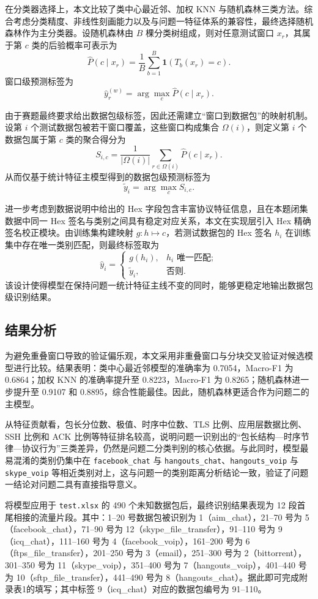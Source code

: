 \documentclass[UTF8,a4paper,12pt]{ctexart}
\begin{document}
在分类器选择上，本文比较了类中心最近邻、加权 KNN 与随机森林三类方法。综合考虑分类精度、非线性刻画能力以及与问题一特征体系的兼容性，最终选择随机森林作为主分类器。设随机森林由 $B$ 棵分类树组成，则对任意测试窗口 $x_r$，其属于第 $c$ 类的后验概率可表示为
\[
\hat P(c\mid x_r)=\frac1B\sum_{b=1}^B\mathbf 1(T_b(x_r)=c).
\]
窗口级预测标签为
\[
\hat y_r^{(w)}=\arg\max_c \hat P(c\mid x_r).
\]

由于赛题最终要求给出数据包级标签，因此还需建立“窗口到数据包”的映射机制。设第 $i$ 个测试数据包被若干窗口覆盖，这些窗口构成集合 $\Omega(i)$，则定义第 $i$ 个数据包属于第 $c$ 类的聚合得分为
\[
S_{i,c}=\frac1{|\Omega(i)|}\sum_{r\in\Omega(i)}\hat P(c\mid x_r).
\]
从而仅基于统计特征主模型得到的数据包级预测标签为
\[
\tilde y_i=\arg\max_c S_{i,c}.
\]

进一步考虑到数据说明中给出的 Hex 字段包含丰富协议特征信息，且在本题闭集数据中同一 Hex 签名与类别之间具有稳定对应关系，本文在实现层引入 Hex 精确签名校正模块。由训练集构建映射 $g:h\mapsto c$，若测试数据包的 Hex 签名 $h_i$ 在训练集中存在唯一类别匹配，则最终标签取为
\[
\hat y_i=
\begin{cases}
g(h_i), & h_i \text{ 唯一匹配};\\
\tilde y_i, & \text{否则}.
\end{cases}
\]
该设计使得模型在保持问题一统计特征主线不变的同时，能够更稳定地输出数据包级识别结果。

\subsection{结果分析}

为避免重叠窗口导致的验证偏乐观，本文采用非重叠窗口与分块交叉验证对候选模型进行比较。结果表明：类中心最近邻模型的准确率为 0.7054，Macro-F1 为 0.6864；加权 KNN 的准确率提升至 0.8223，Macro-F1 为 0.8265；随机森林进一步提升至 0.9107 和 0.8895，综合性能最佳。因此，随机森林更适合作为问题二的主模型。

从特征贡献看，包长分位数、极值、时序中位数、TLS 比例、应用层数据比例、SSH 比例和 ACK 比例等特征排名较高，说明问题一识别出的“包长结构—时序节律—协议行为”三类差异，仍然是问题二分类判别的核心依据。与此同时，模型最易混淆的类别仍集中在 \texttt{facebook\_chat} 与 \texttt{hangouts\_chat}、\texttt{hangouts\_voip} 与 \texttt{skype\_voip} 等相近类别对上，这与问题一的类别距离分析结论一致，验证了问题一结论对问题二具有直接指导意义。

将模型应用于 \texttt{test.xlsx} 的 490 个未知数据包后，最终识别结果表现为 12 段首尾相接的流量片段。其中：1--20 号数据包被识别为 1（aim\_chat），21--70 号为 5（facebook\_chat），71--90 号为 12（skype\_file\_transfer），91--110 号为 9（icq\_chat），111--160 号为 4（facebook\_voip），161--200 号为 6（ftps\_file\_transfer），201--250 号为 3（email），251--300 号为 2（bittorrent），301--350 号为 11（skype\_voip），351--400 号为 7（hangouts\_voip），401--440 号为 10（sftp\_file\_transfer），441--490 号为 8（hangouts\_chat）。据此即可完成附录表1的填写；其中标签 9（icq\_chat）对应的数据包编号为 91--110。
\end{document}
